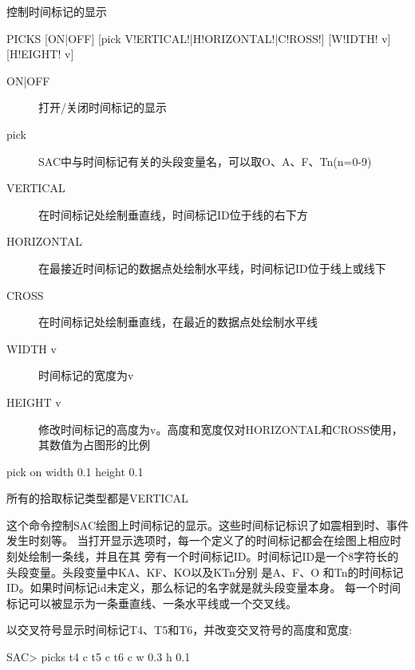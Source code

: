 \label{cmd:picks}

控制时间标记的显示

\begin{SACSTX}
PICKS [ON|OFF] [pick V!ERTICAL!|H!ORIZONTAL!|C!ROSS!] [W!IDTH! v] [H!EIGHT! v]
\end{SACSTX}

\begin{description}
\item [ON|OFF] 打开/关闭时间标记的显示
\item [pick] SAC中与时间标记有关的头段变量名，可以取O、A、F、Tn(n=0-9)
\item [VERTICAL] 在时间标记处绘制垂直线，时间标记ID位于线的右下方
\item [HORIZONTAL] 在最接近时间标记的数据点处绘制水平线，时间标记ID位于线上或线下
\item [CROSS] 在时间标记处绘制垂直线，在最近的数据点处绘制水平线
\item [WIDTH v] 时间标记的宽度为v
\item [HEIGHT v] 修改时间标记的高度为v。高度和宽度仅对HORIZONTAL和CROSS使用，其数值为占图形的比例
\end{description}

\begin{SACDFT}
pick on width 0.1 height 0.1
\end{SACDFT}
所有的拾取标记类型都是VERTICAL

这个命令控制SAC绘图上时间标记的显示。这些时间标记标识了如震相到时、事件发生时刻等。
当打开显示选项时，每一个定义了的时间标记都会在绘图上相应时刻处绘制一条线，并且在其
旁有一个时间标记ID。时间标记ID是一个8字符长的头段变量。头段变量中KA、KF、KO以及KTn分别
是A、F、O 和Tn的时间标记ID。如果时间标记id未定义，那么标记的名字就是就头段变量本身。
每一个时间标记可以被显示为一条垂直线、一条水平线或一个交叉线。

以交叉符号显示时间标记T4、T5和T6，并改变交叉符号的高度和宽度:
\begin{SACCode}
SAC> picks t4 c t5 c t6 c w 0.3 h 0.1
\end{SACCode}
